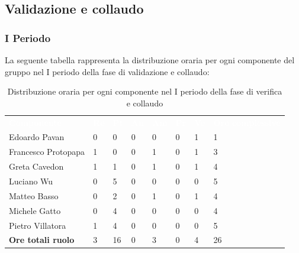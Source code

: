 \subsection{Validazione e collaudo}
\subsubsection{I Periodo}
La seguente tabella rappresenta la distribuzione oraria per ogni componente del gruppo nel I periodo della fase di validazione e collaudo:
\begin{table}[!htbp]
\begin{center}
\renewcommand{\arraystretch}{1.25}
\begin{tabular}{ m{}<{\centering}  m{}<{\centering} m{}<{\centering} m{}<{\centering}  m{}<{\centering}  m{}<{\centering}  m{}<{\centering}  m{}<{\centering}   }
	\rowcolor{darkblue}
	\textcolor{white}{\textbf{Componente}} &\textcolor{white}{\textbf{Re}}&\textcolor{white}{\textbf{Pt}}&\textcolor{white}{\textbf{An}}&\textcolor{white}{\textbf{Am}}&\textcolor{white}{\textbf{Pr}}&\textcolor{white}{\textbf{Ve}}&\textcolor{white}{\textbf{Ore complessive}}\\ 
	Edoardo Pavan & 0 & 0 & 0 & 0 & 0 & 1 & 1 \\	
	
	Francesco Protopapa & 1 & 0 & 0 & 1 & 0 & 1 & 3 \\

	Greta Cavedon & 1 & 1 & 0 & 1 & 0 & 1 & 4 \\
	
	Luciano Wu & 0 & 5 & 0 & 0 & 0 & 0 &5 \\
	
	Matteo Basso & 0 & 2 & 0 & 1 & 0 & 1 & 4 \\
	
	Michele Gatto & 0 & 4 & 0 & 0 & 0 & 0 & 4 \\
	
	Pietro Villatora & 1 & 4 & 0 & 0 & 0 & 0 & 5 \\
	
	\textbf{Ore totali ruolo} & 3 & 16 & 0 & 3 & 0 & 4 & 26 \\

\end{tabular}
\caption{Distribuzione oraria per ogni componente nel I periodo della fase di verifica e collaudo}
\end{center}
\end{table}

